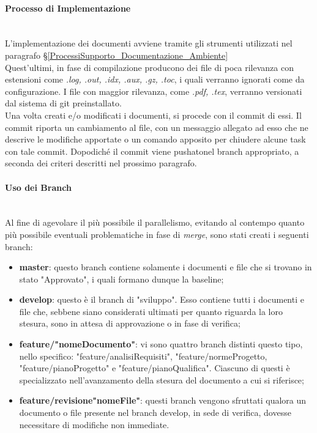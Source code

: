 \paragraph{Processo di Implementazione} \-\\
L'implementazione dei documenti avviene tramite gli strumenti utilizzati nel paragrafo §\ref{ProcessiSupporto_Documentazione_Ambiente}\\
Quest'ultimi, in fase di compilazione producono dei file di poca rilevanza con estensioni come \textit{.log, .out, .idx, .aux, .gz, .toc}, i quali verranno ignorati come da configurazione. I file con maggior rilevanza, come \textit{.pdf, .tex}, verranno versionati dal sistema di git preinstallato. \\
Una volta creati e/o modificati i documenti, si procede con il commit di essi. Il commit riporta un cambiamento al file, con un messaggio allegato ad esso che ne
descrive le modifiche apportate o un comando apposito per chiudere alcune task con tale commit. Dopodiché il commit viene pushato\glossario nel branch appropriato, a seconda dei criteri descritti nel prossimo paragrafo.

\paragraph{Uso dei Branch} ~\\
Al fine di agevolare il più possibile il parallelismo, evitando al contempo quanto più possibile eventuali problematiche in fase di \textit{merge}\glossario, sono stati creati i seguenti branch\glossario:
\begin{itemize}
	\item \textbf{master}: questo branch contiene solamente i documenti e file che si trovano in stato "Approvato", i quali formano dunque la baseline\glossario;
	\item \textbf{develop}: questo è il branch di "sviluppo". Esso contiene tutti i documenti e file che, sebbene siano considerati ultimati per quanto riguarda la loro stesura, sono in attesa di approvazione o in fase di verifica;
	\item \textbf{feature/"nomeDocumento"}: vi sono quattro branch distinti questo tipo, nello specifico: "feature/analisiRequisiti", "feature/normeProgetto, "feature/pianoProgetto" e "feature/pianoQualifica". Ciascuno di questi è specializzato nell'avanzamento della stesura del documento a cui si riferisce;
	\item \textbf{feature/revisione"nomeFile"}: questi branch vengono sfruttati qualora un documento o file presente nel branch develop, in sede di verifica, dovesse necessitare di modifiche non immediate.
\end{itemize}

